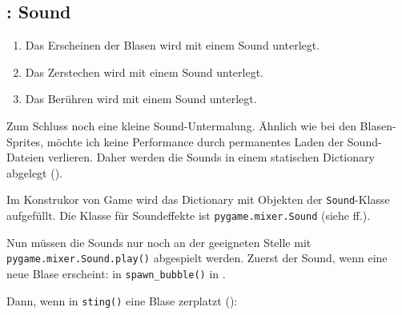 
\subsection{: Sound}
\begin{enumerate}
 \item Das Erscheinen der Blasen wird mit einem Sound unterlegt.\label{reqSoundErscheinen}
 \item Das Zerstechen wird mit einem Sound unterlegt.\label{reqSoundZerstechen}
 \item Das Berühren wird mit einem Sound unterlegt.\label{reqSoundBerühren}
\end{enumerate}
\er

Zum Schluss noch eine kleine Sound-Untermalung. Ähnlich wie bei den Blasen-Sprites, möchte ich keine Performance durch permanentes Laden der Sound-Dateien verlieren. Daher werden die Sounds in einem statischen Dictionary abgelegt (). 



Im Konstrukor von Game wird das Dictionary mit Objekten der \texttt{Sound}-Klasse aufgefüllt. Die Klasse für Soundeffekte ist \texttt{pygame.mixer.Sound} (siehe ff.).


Nun müssen die Sounds nur noch an der geeigneten Stelle mit \texttt{pygame.mixer.Sound.\-play()} abgespielt werden. Zuerst der Sound, wenn eine neue Blase erscheint: in \texttt{spawn\_\-bubb\-le()} in .


Dann, wenn in \texttt{sting()} eine Blase zerplatzt ():

